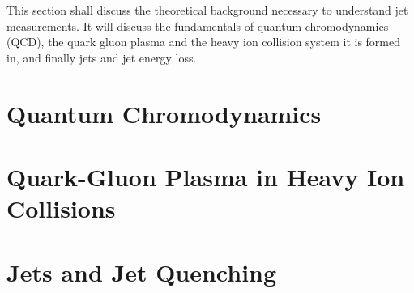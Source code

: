 This section shall discuss the theoretical background necessary to understand jet measurements.
It will discuss the fundamentals of quantum chromodynamics (QCD), the quark gluon plasma and the heavy ion collision system it is formed in, and finally jets and jet energy loss.

\section{Quantum Chromodynamics}
\label{sec:qcd}


\section{Quark-Gluon Plasma in Heavy Ion Collisions}
\label{sec:qgp_hi}


%

\section{Jets and Jet Quenching}
\label{sec:jets}


